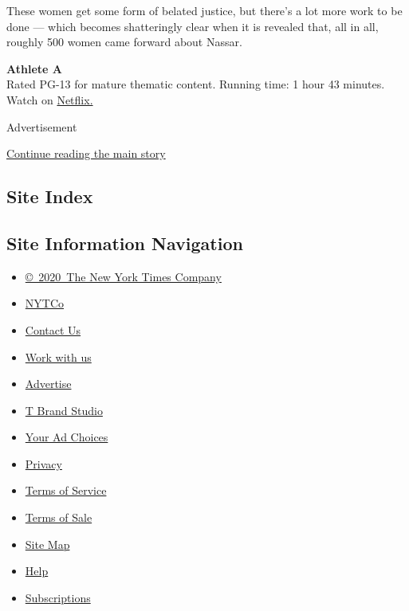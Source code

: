 These women get some form of belated justice, but there's a lot more
work to be done --- which becomes shatteringly clear when it is revealed
that, all in all, roughly 500 women came forward about Nassar.

\textbf{Athlete A}\\
Rated PG-13 for mature thematic content. Running time: 1 hour 43
minutes. Watch on
\href{https://www.netflix.com/title/81034185}{Netflix.}

Advertisement

\protect\hyperlink{after-bottom}{Continue reading the main story}

\hypertarget{site-index}{%
\subsection{Site Index}\label{site-index}}

\hypertarget{site-information-navigation}{%
\subsection{Site Information
Navigation}\label{site-information-navigation}}

\begin{itemize}
\tightlist
\item
  \href{https://help.nytimes.com/hc/en-us/articles/115014792127-Copyright-notice}{©~2020~The
  New York Times Company}
\end{itemize}

\begin{itemize}
\tightlist
\item
  \href{https://www.nytco.com/}{NYTCo}
\item
  \href{https://help.nytimes.com/hc/en-us/articles/115015385887-Contact-Us}{Contact
  Us}
\item
  \href{https://www.nytco.com/careers/}{Work with us}
\item
  \href{https://nytmediakit.com/}{Advertise}
\item
  \href{http://www.tbrandstudio.com/}{T Brand Studio}
\item
  \href{https://www.nytimes.com/privacy/cookie-policy\#how-do-i-manage-trackers}{Your
  Ad Choices}
\item
  \href{https://www.nytimes.com/privacy}{Privacy}
\item
  \href{https://help.nytimes.com/hc/en-us/articles/115014893428-Terms-of-service}{Terms
  of Service}
\item
  \href{https://help.nytimes.com/hc/en-us/articles/115014893968-Terms-of-sale}{Terms
  of Sale}
\item
  \href{https://spiderbites.nytimes.com}{Site Map}
\item
  \href{https://help.nytimes.com/hc/en-us}{Help}
\item
  \href{https://www.nytimes.com/subscription?campaignId=37WXW}{Subscriptions}
\end{itemize}
